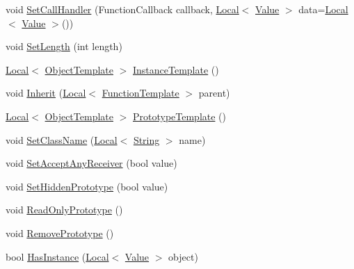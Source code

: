 \begin{DoxyCompactItemize}
\item 
void \hyperlink{classv8_1_1FunctionTemplate_a49babb7ea2d786a483a71514209455b6}{Set\+Call\+Handler} (Function\+Callback callback, \hyperlink{classv8_1_1Local}{Local}$<$ \hyperlink{classv8_1_1Value}{Value} $>$ data=\hyperlink{classv8_1_1Local}{Local}$<$ \hyperlink{classv8_1_1Value}{Value} $>$())
\item 
void \hyperlink{classv8_1_1FunctionTemplate_a5faf23b28ee3480b23ce054d0f389a75}{Set\+Length} (int length)
\item 
\hyperlink{classv8_1_1Local}{Local}$<$ \hyperlink{classv8_1_1ObjectTemplate}{Object\+Template} $>$ \hyperlink{classv8_1_1FunctionTemplate_a00dd9725566908e8fd14064542f5a781}{Instance\+Template} ()
\item 
void \hyperlink{classv8_1_1FunctionTemplate_abc11c462facf11bafd541892815c5425}{Inherit} (\hyperlink{classv8_1_1Local}{Local}$<$ \hyperlink{classv8_1_1FunctionTemplate}{Function\+Template} $>$ parent)
\item 
\hyperlink{classv8_1_1Local}{Local}$<$ \hyperlink{classv8_1_1ObjectTemplate}{Object\+Template} $>$ \hyperlink{classv8_1_1FunctionTemplate_aa2bcc2652b5f0fdbc666d943ccf72021}{Prototype\+Template} ()
\item 
void \hyperlink{classv8_1_1FunctionTemplate_a491e77dc7ceb5b0fe75880d11f2dbe9e}{Set\+Class\+Name} (\hyperlink{classv8_1_1Local}{Local}$<$ \hyperlink{classv8_1_1String}{String} $>$ name)
\item 
void \hyperlink{classv8_1_1FunctionTemplate_a5ffdc68d8035b02ed7583950b76ef91f}{Set\+Accept\+Any\+Receiver} (bool value)
\item 
void \hyperlink{classv8_1_1FunctionTemplate_ade426e8a21d777ae6100e6c1aa7bfaee}{Set\+Hidden\+Prototype} (bool value)
\item 
void \hyperlink{classv8_1_1FunctionTemplate_a91d2e0643e8c5a53ab1d75f7766c2422}{Read\+Only\+Prototype} ()
\item 
void \hyperlink{classv8_1_1FunctionTemplate_a4a184aca244174c7fe52d58871d3129e}{Remove\+Prototype} ()
\item 
bool \hyperlink{classv8_1_1FunctionTemplate_a90d838f3456d300bd19d2a2cb98645bd}{Has\+Instance} (\hyperlink{classv8_1_1Local}{Local}$<$ \hyperlink{classv8_1_1Value}{Value} $>$ object)
\end{DoxyCompactItemize}
